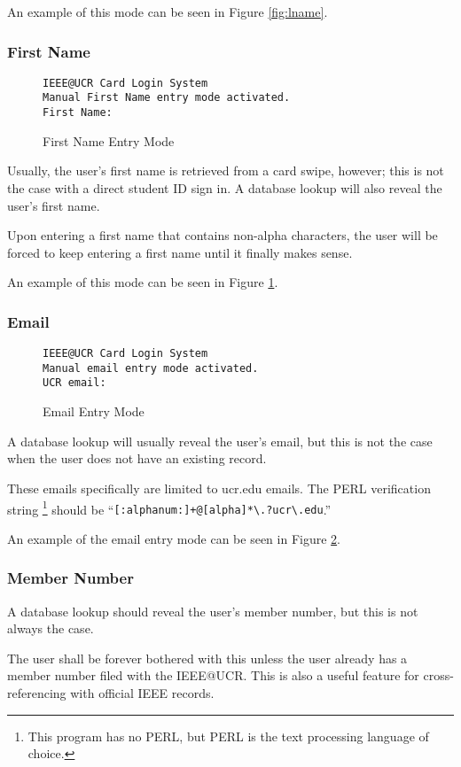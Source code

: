 \documentclass[12pt]{article}
\begin{document}
An example of this mode can be seen in Figure \ref{fig:lname}.
\subsubsection{First Name}
\begin{figure}[h]
{\tt IEEE@UCR Card Login System\\
Manual First Name entry mode activated.\\
First Name:
}
\caption{First Name Entry Mode}
\label{fig:fname}
\end{figure}
Usually, the user's first name is retrieved from a card swipe, however; this is
not the case with a direct student ID sign in.  A database lookup will also
reveal the user's first name.

Upon entering a first name that contains non-alpha characters, the user will be
forced to keep entering a first name until it finally makes sense.

An example of this mode can be seen in Figure \ref{fig:fname}.
\subsubsection{Email}
\begin{figure}[h]
{\tt IEEE@UCR Card Login System\\
Manual email entry mode activated.\\
UCR email:
}
\caption{Email Entry Mode}
\label{fig:email}
\end{figure}
A database lookup will usually reveal the user's email, but this is not the
case when the user does not have an existing record.

These emails specifically are limited to ucr.edu emails.  The PERL
verification string \footnote{This program has no PERL, but PERL is the
text processing language of choice.} should be 
``{\tt[:alphanum:]+@[alpha]*\textbackslash .?ucr\textbackslash .edu}.''

An example of the email entry mode can be seen in Figure \ref{fig:email}.
\subsubsection{Member Number}
A database lookup should reveal the user's member number, but this is not
always the case.

The user shall be forever bothered with this unless the user
already has a member number filed with the IEEE@UCR.  This is also a useful
feature for cross-referencing with official IEEE records.
\end{document}
